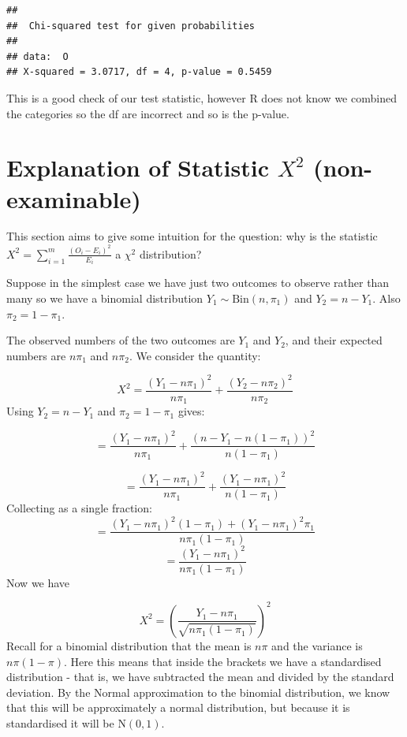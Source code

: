 \documentclass[
]{book}
\theoremstyle{definition}
\theoremstyle{definition}
\theoremstyle{definition}
\theoremstyle{definition}
\theoremstyle{remark}
\begin{document}
\begin{verbatim}
## 
##  Chi-squared test for given probabilities
## 
## data:  O
## X-squared = 3.0717, df = 4, p-value = 0.5459
\end{verbatim}

This is a good check of our test statistic, however R does not know we combined the categories so the df are incorrect and so is the p-value.

\hypertarget{explanation-of-statistic-x2-non-examinable}{%
\section{\texorpdfstring{Explanation of Statistic \(X^2\) (non-examinable)}{Explanation of Statistic X\^{}2 (non-examinable)}}\label{explanation-of-statistic-x2-non-examinable}}

This section aims to give some intuition for the question: why is the statistic \(X^2 = \sum_{i=1}^m \frac{(O_i-E_i)^2}{E_i}\) a \(\chi^2\) distribution?

Suppose in the simplest case we have just two outcomes to observe rather than many so we have a binomial distribution \(Y_1 \sim \text{Bin}(n,\pi_1)\) and \(Y_2 = n - Y_1\). Also \(\pi_2 = 1-\pi_1\).

The observed numbers of the two outcomes are \(Y_1\) and \(Y_2\), and their expected numbers are \(n\pi_1\) and \(n\pi_2\). We consider the quantity:

\[X^2 = \frac{(Y_1-n\pi_1)^2}{n\pi_1} + \frac{(Y_2-n\pi_2)^2}{n\pi_2}\]
Using \(Y_2 = n - Y_1\) and \(\pi_2 = 1-\pi_1\) gives:

\[= \frac{(Y_1-n\pi_1)^2}{n\pi_1} + \frac{(n-Y_1-n(1-\pi_1))^2}{n(1-\pi_1)}\]

\[=\frac{(Y_1-n\pi_1)^2}{n\pi_1} + \frac{(Y_1-n\pi_1)^2}{n(1-\pi_1)}\]
Collecting as a single fraction:
\[=\frac{(Y_1-n\pi_1)^2(1-\pi_1)+(Y_1-n\pi_1)^2\pi_1}{n\pi_1(1-\pi_1)}\]
\[=\frac{(Y_1-n\pi_1)^2}{n\pi_1(1-\pi_1)}\]
Now we have

\[X^2 = \left( \frac{Y_1 - n\pi_1}{\sqrt{n\pi_1(1-\pi_1)}}\right)^2\]
Recall for a binomial distribution that the mean is \(n\pi\) and the variance is \(n\pi(1-\pi)\). Here this means that inside the brackets we have a standardised distribution - that is, we have subtracted the mean and divided by the standard deviation. By the Normal approximation to the binomial distribution, we know that this will be approximately a normal distribution, but because it is standardised it will be \(\text{N}(0,1)\).
\end{document}
